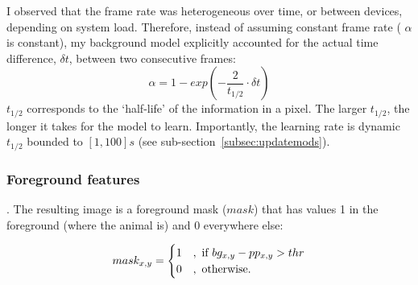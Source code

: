 

I observed that the frame rate was heterogeneous over time, or between devices, depending on system load.
Therefore, instead of assuming constant frame rate (\ie{} $\alpha$ is constant), my background model explicitly accounted for the actual time difference, $\delta t$, between two consecutive frames:
\begin{equation}
\alpha= 1-exp(-\frac{2}{t_{1/2}} \cdot \delta t)
\label{eq:halflife}
\end{equation}
$t_{1/2}$ corresponds to the `half-life' of the information in a pixel. 
The larger $t_{1/2}$, the longer it takes for the model to learn.
Importantly, the learning rate is dynamic $t_{1/2}$ bounded to $[1,100]s$ (see sub-section~\ref{subsec:updatemods}).

\subsubsection{Foreground features}

.
The resulting image is a foreground mask ($mask$) that has values 1 in the foreground (where the animal is) and 0 everywhere else:

\begin{equation}
{
mask_{x,y} = \begin{cases}
1 &, \text{ if } bg_{x,y} - pp_{x,y} > thr \\
0 &, \text{ otherwise}.
\end{cases}
}
\label{eq:threshold}
\end{equation}

